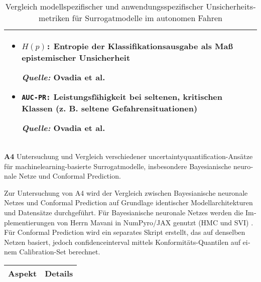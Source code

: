 \begin{otherlanguage}{ngerman}
\begin{table}[!htpb]
\begin{tabularx}{\textwidth}{|>{\centering\arraybackslash}l|X|X|}
\begin{itemize}[topsep=0em, itemsep=0.125em, leftmargin=*, label={}]
			\item \texttt{$H(p)$:} Entropie der Klassifikationsausgabe als Maß epistemischer Unsicherheit \par
			\begin{scriptsize}\textit{Quelle:} Ovadia et al. \parencite{ovadia2019can}\end{scriptsize}
			
			\item \texttt{AUC-PR:} Leistungsfähigkeit bei seltenen, kritischen Klassen (z. B. seltene Gefahrensituationen) \par
			\begin{scriptsize}\textit{Quelle:} Ovadia et al. \parencite{ovadia2019can}\end{scriptsize}
		\end{itemize}
		\\
		\hline
		
	\end{tabularx}
	\caption{Vergleich modellspezifischer und anwendungsspezifischer Unsicherheitsmetriken für Surrogatmodelle im autonomen Fahren}
	\label{tab:chapter6r71}
\end{table}



\pagebreak


\textbf{A4} Untersuchung und Vergleich verschiedener \gls{uncertaintyquantification}-Ansätze für \gls{machinelearning}-basierte Surrogatmodelle, insbesondere \gls{Bayesianische neuronale Netze} und \gls{Conformal Prediction}.
\par\vspace{1\baselineskip}\noindent

Zur Untersuchung von A4 wird der Vergleich zwischen \gls{Bayesianische neuronale Netze}s und \gls{Conformal Prediction} auf Grundlage identischer Modellarchitekturen und Datensätze durchgeführt. Für \gls{Bayesianische neuronale Netze}s werden die Implementierungen von Herrn Mavani in NumPyro/JAX genutzt (HMC und SVI) \parencite{nmavani2025}. Für \gls{Conformal Prediction} wird ein separates Skript erstellt, das auf denselben Netzen basiert, jedoch \gls{confidenceinterval} mittels Konformitäts-Quantilen auf einem Calibration-Set berechnet.

\begin{table}[htbp]
  \centering
  \footnotesize
  \begin{tabularx}{\textwidth}{|l|X|}
  \hline
  \textbf{Aspekt} & \hspace{0.6em}\textbf{Details} \\ \hline


\end{tabularx}
\end{table}
\end{otherlanguage}
